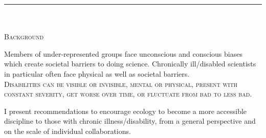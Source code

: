 \documentclass{beamer}
\begin{document}
\begin{center}
\rule{\linewidth}{0.3cm}
\begin{minipage}{0.25\linewidth}
\begin{Large}
\vspace{0.5cm}
~\\
~\\
\textsc{Background}\\
\end{Large}
Members of under-represented groups face unconscious and conscious biases which create societal barriers to doing science.  Chronically ill/disabled scientists in particular often face physical as well as societal barriers.\\ 

\textsc{Disabilities can be visible or invisible, mental or physical, present with constant severity, get worse over time, or fluctuate from bad to less bad.\\ } 

I present recommendations to encourage ecology to become a more accessible discipline to those with chronic illness/disability, from a general perspective and on the scale of individual collaborations.\\


\end{minipage}
\end{center}
\end{document}
